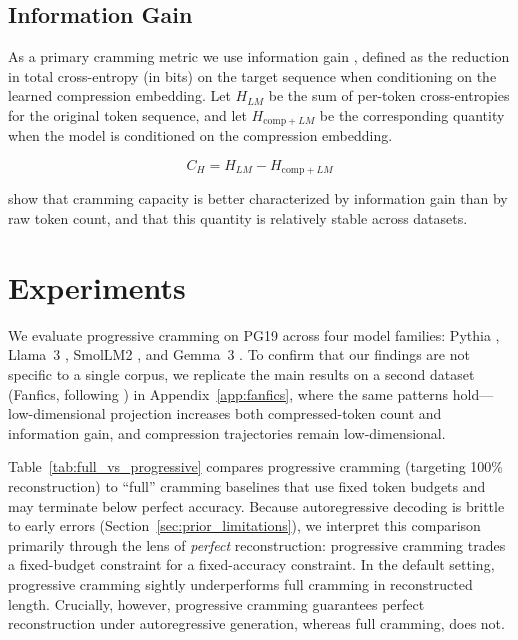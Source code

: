 \documentclass{article}
\theoremstyle{plain}
\theoremstyle{definition}
\theoremstyle{remark}
\begin{document}
\subsection{Information Gain}

As a primary cramming metric we use information gain \cite{kuratov2025cramming}, defined as the reduction in total cross-entropy (in bits) on the target sequence when conditioning on the learned compression embedding.
Let $H_{LM}$ be the sum of per-token cross-entropies for the original token sequence, and let $H_{\mathrm{comp}+LM}$ be the corresponding quantity when the model is conditioned on the compression embedding.

\begin{equation}
    C_H = H_{LM} - H_{\mathrm{comp}+LM}
\end{equation}

\citet{kuratov2025cramming} show that cramming capacity is better characterized by information gain than by raw token count, and that this quantity is relatively stable across datasets.

\section{Experiments}
\label{sec:experiments}

We evaluate progressive cramming on PG19 \cite{Rae2020CompressiveTransformerPG19} across four model families: Pythia \cite{biderman2023pythia}, Llama~3 \cite{dubey2024llama3}, SmolLM2 \cite{allal2025smollm2}, and Gemma~3 \cite{gemma3}.
To confirm that our findings are not specific to a single corpus, we replicate the main results on a second dataset (Fanfics, following \citet{kuratov2025cramming}) in Appendix~\ref{app:fanfics}, where the same patterns hold---low-dimensional projection increases both compressed-token count and information gain, and compression trajectories remain low-dimensional.

Table~\ref{tab:full_vs_progressive} compares progressive cramming (targeting 100\% reconstruction) to ``full'' cramming baselines that use fixed token budgets and may terminate below perfect accuracy.
Because autoregressive decoding is brittle to early errors (Section~\ref{sec:prior_limitations}), we interpret this comparison primarily through the lens of \emph{perfect} reconstruction: progressive cramming trades a fixed-budget constraint for a fixed-accuracy constraint.
In the default setting, progressive cramming sightly underperforms full cramming in reconstructed length. Crucially, however, progressive cramming guarantees perfect reconstruction under autoregressive generation, whereas full cramming, does not.
\end{document}
